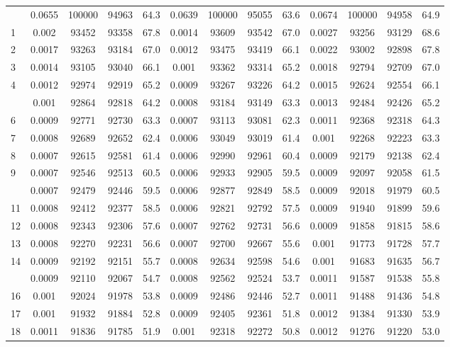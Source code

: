 \documentclass[
  14pt,
]{article}
\begin{document}
\begin{longtable}[t]{lcccccccccccc}
\endfoot
\bottomrule
\endlastfoot
0 & 0.0655 & 100000 & 94963 & 64.3 & 0.0639 & 100000 & 95055 & 63.6 & 0.0674 & 100000 & 94958 & 64.9\\
1 & 0.002 & 93452 & 93358 & 67.8 & 0.0014 & 93609 & 93542 & 67.0 & 0.0027 & 93256 & 93129 & 68.6\\
2 & 0.0017 & 93263 & 93184 & 67.0 & 0.0012 & 93475 & 93419 & 66.1 & 0.0022 & 93002 & 92898 & 67.8\\
3 & 0.0014 & 93105 & 93040 & 66.1 & 0.001 & 93362 & 93314 & 65.2 & 0.0018 & 92794 & 92709 & 67.0\\
4 & 0.0012 & 92974 & 92919 & 65.2 & 0.0009 & 93267 & 93226 & 64.2 & 0.0015 & 92624 & 92554 & 66.1\\
\addlinespace
5 & 0.001 & 92864 & 92818 & 64.2 & 0.0008 & 93184 & 93149 & 63.3 & 0.0013 & 92484 & 92426 & 65.2\\
6 & 0.0009 & 92771 & 92730 & 63.3 & 0.0007 & 93113 & 93081 & 62.3 & 0.0011 & 92368 & 92318 & 64.3\\
7 & 0.0008 & 92689 & 92652 & 62.4 & 0.0006 & 93049 & 93019 & 61.4 & 0.001 & 92268 & 92223 & 63.3\\
8 & 0.0007 & 92615 & 92581 & 61.4 & 0.0006 & 92990 & 92961 & 60.4 & 0.0009 & 92179 & 92138 & 62.4\\
9 & 0.0007 & 92546 & 92513 & 60.5 & 0.0006 & 92933 & 92905 & 59.5 & 0.0009 & 92097 & 92058 & 61.5\\
\addlinespace
10 & 0.0007 & 92479 & 92446 & 59.5 & 0.0006 & 92877 & 92849 & 58.5 & 0.0009 & 92018 & 91979 & 60.5\\
11 & 0.0008 & 92412 & 92377 & 58.5 & 0.0006 & 92821 & 92792 & 57.5 & 0.0009 & 91940 & 91899 & 59.6\\
12 & 0.0008 & 92343 & 92306 & 57.6 & 0.0007 & 92762 & 92731 & 56.6 & 0.0009 & 91858 & 91815 & 58.6\\
13 & 0.0008 & 92270 & 92231 & 56.6 & 0.0007 & 92700 & 92667 & 55.6 & 0.001 & 91773 & 91728 & 57.7\\
14 & 0.0009 & 92192 & 92151 & 55.7 & 0.0008 & 92634 & 92598 & 54.6 & 0.001 & 91683 & 91635 & 56.7\\
\addlinespace
15 & 0.0009 & 92110 & 92067 & 54.7 & 0.0008 & 92562 & 92524 & 53.7 & 0.0011 & 91587 & 91538 & 55.8\\
16 & 0.001 & 92024 & 91978 & 53.8 & 0.0009 & 92486 & 92446 & 52.7 & 0.0011 & 91488 & 91436 & 54.8\\
17 & 0.001 & 91932 & 91884 & 52.8 & 0.0009 & 92405 & 92361 & 51.8 & 0.0012 & 91384 & 91330 & 53.9\\
18 & 0.0011 & 91836 & 91785 & 51.9 & 0.001 & 92318 & 92272 & 50.8 & 0.0012 & 91276 & 91220 & 53.0\\

\end{longtable}
\end{document}
